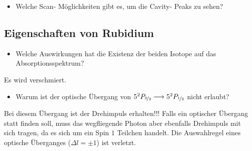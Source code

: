 \documentclass[a4paper,oneside]{article}
\begin{document}
\begin{itemize}
\item Welche Scan- Möglichkeiten gibt es, um die Cavity- Peaks zu sehen?
\end{itemize}
\subsection{Eigenschaften von Rubidium}
\begin{itemize}
\item Welche Auswirkungen hat die Existenz der beiden Isotope auf das Absorptionsspektrum?
\end{itemize}
Es wird verschmiert.

\begin{itemize}
\item Warum ist der optische Übergang von 
$5^2P_{\nicefrac{3}{2}}\longrightarrow5^2P_{\nicefrac{1}{2}}$
nicht erlaubt?
\end{itemize}
Bei diesem Übergang ist der Drehimpuls erhalten!!! Falls ein optischer Übergang statt finden soll, muss das wegfliegende Photon aber ebenfalls Drehimpuls mit sich tragen, da es sich um ein Spin $1$ Teilchen handelt. Die Auswahlregel eines optische Überganges ($\Delta l=\pm1$) ist verletzt.
\end{document}
